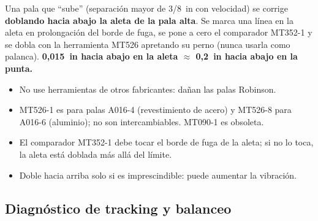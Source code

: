 Una pala que ``sube'' (separación mayor de 3/8~in con velocidad) se corrige \textbf{doblando hacia abajo la aleta de la pala alta}. Se marca una línea en la aleta en prolongación del borde de fuga, se pone a cero el comparador MT352-1 y se dobla con la herramienta MT526 apretando su perno (nunca usarla como palanca). \textbf{0,015~in hacia abajo en la aleta $\approx$ 0,2~in hacia abajo en la punta.}

\begin{precaucion}
\begin{itemize}
\item No use herramientas de otros fabricantes: dañan las palas Robinson.
\item MT526-1 es para palas A016-4 (revestimiento de acero) y MT526-8 para A016-6 (aluminio); no son intercambiables. MT090-1 es obsoleta.
\item El comparador MT352-1 debe tocar el borde de fuga de la aleta; si no lo toca, la aleta está doblada más allá del límite.
\item Doble hacia arriba solo si es imprescindible: puede aumentar la vibración.
\end{itemize}
\end{precaucion}

\subsection{Diagnóstico de tracking y balanceo}

